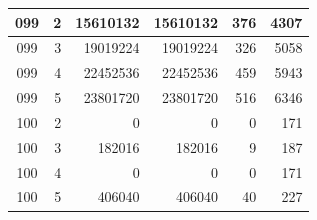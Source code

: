 \begin{longtable}{|c|r|r|r|r|r|}
\hline
099 & 2 & 15610132 & 15610132 & 376 & 4307 \\
\hline
099 & 3 & 19019224 & 19019224 & 326 & 5058 \\
\hline
099 & 4 & 22452536 & 22452536 & 459 & 5943 \\
\hline
099 & 5 & 23801720 & 23801720 & 516 & 6346 \\
\hline
100 & 2 & 0 & 0 & 0 & 171 \\
\hline
100 & 3 & 182016 & 182016 & 9 & 187 \\
\hline
100 & 4 & 0 & 0 & 0 & 171 \\
\hline
100 & 5 & 406040 & 406040 & 40 & 227 \\
\hline
\end{longtable}
\normalsize
\renewcommand{\arraystretch}{1.2}
